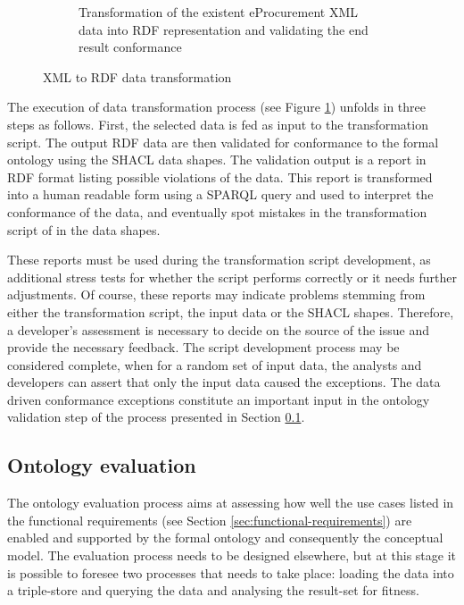 \begin{figure}[!ht]
\begin{subfigure}[b]{.48\textwidth}
			\caption{Transformation of the existent eProcurement XML data into RDF representation and validating the end result conformance}
			\label{fig:sub2}
		\end{subfigure}
		\caption{XML to RDF data transformation}
		\label{fig:transformation-proc}
	\end{figure}


	The execution of data transformation process (see Figure \ref{fig:sub2}) unfolds in three steps as follows. First, the selected data is fed as input to the transformation script. The output RDF data are then validated for conformance to the formal ontology using the SHACL data shapes. The validation output is a report in RDF format listing possible violations of the data. This report is transformed into a human readable form using a SPARQL query and used to interpret the conformance of the data, and eventually spot mistakes in the transformation script of in the data shapes.   
	
	These reports must be used during the transformation script development, as additional stress tests for whether the script performs correctly or it needs further adjustments. Of course, these reports may indicate problems stemming from either the transformation script, the input data or the SHACL shapes. Therefore, a developer's assessment is necessary to decide on the source of the issue and provide the necessary feedback. The script development process may be considered complete, when for a random set of input data, the analysts and developers can assert that only the input data caused the exceptions. The data driven conformance exceptions constitute an important input in the ontology validation step of the process presented in Section \ref{sec:ontology-validation}.
	
	\subsection{Ontology evaluation}
	\label{sec:ontology-validation}
	
	The ontology evaluation process aims at assessing how well the use cases listed in the functional requirements (see Section \ref{sec:functional-requirements}) are enabled and supported by the formal ontology and consequently the conceptual model. The evaluation process needs to be designed elsewhere, but at this stage it is possible to foresee two processes that needs to take place: loading the data into a triple-store and querying the data and analysing the result-set for fitness. 

